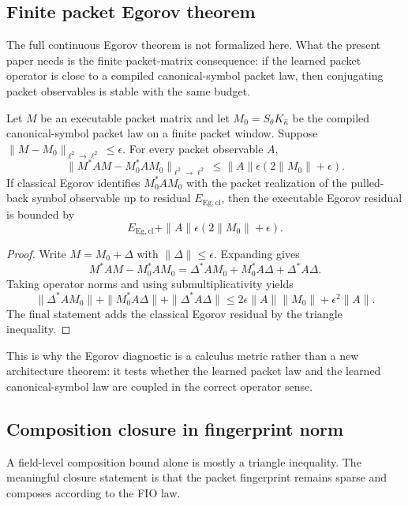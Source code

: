 \subsection{Finite packet Egorov theorem}

The full continuous Egorov theorem is not formalized here.  What the present
paper needs is the finite packet-matrix consequence: if the learned packet
operator is close to a compiled canonical-symbol packet law, then conjugating
packet observables is stable with the same budget.

\begin{theorem}
\label{thm:finite-packet-egorov-stability}
Let $M$ be an executable packet matrix and let
$M_0=S_{\theta}K_{\widehat\kappa}$ be the compiled canonical-symbol packet law
on a finite packet window.  Suppose
$\|M-M_0\|_{\ell^2\to\ell^2}\le \epsilon$.  For every packet observable $A$,
\[
\|M^\ast A M-M_0^\ast A M_0\|_{\ell^2\to\ell^2}
\le
\|A\|\epsilon(2\|M_0\|+\epsilon).
\]
If classical Egorov identifies $M_0^\ast A M_0$ with the packet realization of
the pulled-back symbol observable up to residual $E_{\mathrm{Eg,cl}}$, then
the executable Egorov residual is bounded by
\[
E_{\mathrm{Eg,cl}}+\|A\|\epsilon(2\|M_0\|+\epsilon).
\]
\end{theorem}

\begin{proof}
Write $M=M_0+\Delta$ with $\|\Delta\|\le\epsilon$.  Expanding gives
\[
M^\ast A M-M_0^\ast A M_0
=\Delta^\ast A M_0+M_0^\ast A\Delta+\Delta^\ast A\Delta .
\]
Taking operator norms and using submultiplicativity yields
\[
\|\Delta^\ast A M_0\|+\|M_0^\ast A\Delta\|+\|\Delta^\ast A\Delta\|
\le
2\epsilon\|A\|\|M_0\|+\epsilon^2\|A\|.
\]
The final statement adds the classical Egorov residual by the triangle
inequality.
\end{proof}

This is why the Egorov diagnostic is a calculus metric rather than a new
architecture theorem: it tests whether the learned packet law and the learned
canonical-symbol law are coupled in the correct operator sense.

\subsection{Composition closure in fingerprint norm}

A field-level composition bound alone is mostly a triangle inequality.  The
meaningful closure statement is that the packet fingerprint remains sparse and
composes according to the FIO law.

